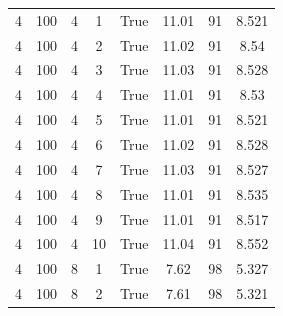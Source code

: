 \begin{table}[H]
{\begin{tabular}{cccccccc}
			\midrule
			4             & 100                             & 4                            & 1            & True             & 11.01                  & 91            & 8.521             \\
			4             & 100                             & 4                            & 2            & True             & 11.02                  & 91            & 8.54              \\
			4             & 100                             & 4                            & 3            & True             & 11.03                  & 91            & 8.528             \\
			4             & 100                             & 4                            & 4            & True             & 11.01                  & 91            & 8.53              \\
			4             & 100                             & 4                            & 5            & True             & 11.01                  & 91            & 8.521             \\
			4             & 100                             & 4                            & 6            & True             & 11.02                  & 91            & 8.528             \\
			4             & 100                             & 4                            & 7            & True             & 11.03                  & 91            & 8.527             \\
			4             & 100                             & 4                            & 8            & True             & 11.01                  & 91            & 8.535             \\
			4             & 100                             & 4                            & 9            & True             & 11.01                  & 91            & 8.517             \\
			4             & 100                             & 4                            & 10           & True             & 11.04                  & 91            & 8.552             \\
			\midrule
			4             & 100                             & 8                            & 1            & True             & 7.62                   & 98            & 5.327             \\
			4             & 100                             & 8                            & 2            & True             & 7.61                   & 98            & 5.321             \\

\end{tabular}}
\end{table}
